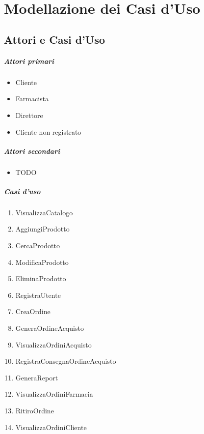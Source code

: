 \chapter{Modellazione dei Casi d'Uso}

\section{Attori e Casi d'Uso}

\paragraph{Attori primari}
\begin{itemize}
	\item Cliente
	\item Farmacista
	\item Direttore
	\item Cliente non registrato
\end{itemize}

\paragraph{Attori secondari}
\begin{itemize}
	\item TODO
\end{itemize}

\paragraph{Casi d'uso}
\begin{enumerate}
	\item VisualizzaCatalogo %
	\item AggiungiProdotto %
	\item CercaProdotto %
	\item ModificaProdotto %
	\item EliminaProdotto %
	\item RegistraUtente %
	\item CreaOrdine %
	\item GeneraOrdineAcquisto %
	\item VisualizzaOrdiniAcquisto %
	\item RegistraConsegnaOrdineAcquisto %
	\item GeneraReport %
	\item VisualizzaOrdiniFarmacia %
	\item RitiroOrdine %
	\item VisualizzaOrdiniCliente %
\end{enumerate}

